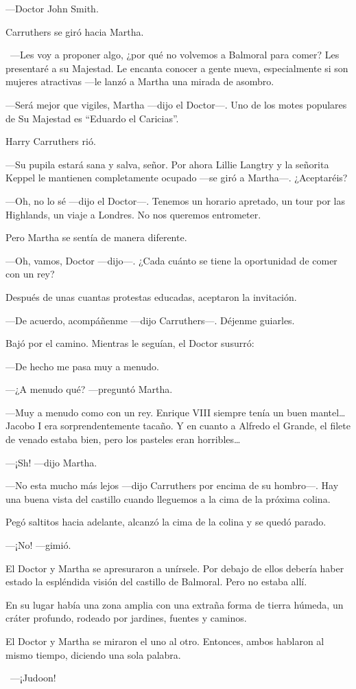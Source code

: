 ---Doctor John Smith.

Carruthers se giró hacia Martha.

~---Les voy a proponer algo, ¿por qué no volvemos a Balmoral para
comer? Les presentaré a su Majestad. Le encanta conocer a gente nueva,
especialmente si son mujeres atractivas ---le lanzó a Martha una mirada
de asombro.

---Será mejor que vigiles, Martha ---dijo el Doctor---. Uno de los motes
populares de Su Majestad es ``Eduardo el Caricias''.

Harry Carruthers rió.

---Su pupila estará sana y salva, señor. Por ahora Lillie Langtry y la
señorita Keppel le mantienen completamente ocupado ---se giró a
Martha---. ¿Aceptaréis?

---Oh, no lo sé ---dijo el Doctor---. Tenemos un horario apretado, un
tour por las Highlands, un viaje a Londres. No nos queremos entrometer.

Pero Martha se sentía de manera diferente.

---Oh, vamos, Doctor ---dijo---. ¿Cada cuánto se tiene la oportunidad de
comer con un rey?

Después de unas cuantas protestas educadas, aceptaron la invitación.

---De acuerdo, acompáñenme ---dijo Carruthers---. Déjenme guiarles.

Bajó por el camino. Mientras le seguían, el Doctor susurró:

---De hecho me pasa muy a menudo.

---¿A menudo qué? ---preguntó Martha.

---Muy a menudo como con un rey. Enrique VIII siempre tenía un buen
mantel\ldots{} Jacobo I era sorprendentemente tacaño. Y en cuanto a
Alfredo el Grande, el filete de venado estaba bien, pero los pasteles
eran horribles\ldots{}

---¡Sh! ---dijo Martha.

---No esta mucho más lejos ---dijo Carruthers por encima de su
hombro---. Hay una buena vista del castillo cuando lleguemos a la cima
de la próxima colina.

Pegó saltitos hacia adelante, alcanzó la cima de la colina y se quedó
parado.

---¡No! ---gimió.

El Doctor y Martha se apresuraron a unírsele. Por debajo de ellos
debería haber estado la espléndida visión del castillo de Balmoral. Pero
no estaba allí.

En su lugar había una zona amplia con una extraña forma de tierra
húmeda, un cráter profundo, rodeado por jardines, fuentes y caminos.

El Doctor y Martha se miraron el uno al otro. Entonces, ambos hablaron
al mismo tiempo, diciendo una sola palabra.

~---¡Judoon!
